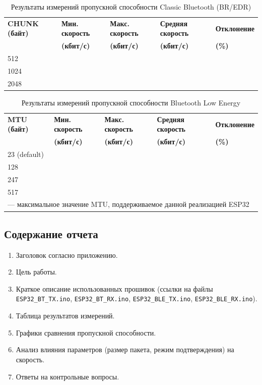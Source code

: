 \begin{table}[htbp]
\centering
\caption{Результаты измерений пропускной способности Classic Bluetooth (BR/EDR)}
\label{tab:bt_results}
\begin{tabularx}{\textwidth}{lXXXX}
\toprule
\textbf{CHUNK (байт)} & \textbf{Мин. скорость} & \textbf{Макс. скорость} & \textbf{Средняя скорость} & \textbf{Отклонение} \\
& \textbf{(кбит/с)} & \textbf{(кбит/с)} & \textbf{(кбит/с)} & \textbf{(\%)} \\
\midrule
512 & & & & \\
1024 & & & & \\
2048 & & & & \\
\bottomrule
\end{tabularx}
\end{table}

\begin{table}[htbp]
\centering
\caption{Результаты измерений пропускной способности Bluetooth Low Energy}
\label{tab:ble_results}
\begin{tabularx}{\textwidth}{lXXXX}
\toprule
\textbf{MTU (байт)} & \textbf{Мин. скорость} & \textbf{Макс. скорость} & \textbf{Средняя скорость} & \textbf{Отклонение} \\
& \textbf{(кбит/с)} & \textbf{(кбит/с)} & \textbf{(кбит/с)} & \textbf{(\%)} \\
\midrule
23 (default) & & & & \\
128 & & & & \\
247 & & & & \\
517 & & & & \\
\bottomrule
\multicolumn{5}{l}{\small * --- максимальное значение MTU, поддерживаемое данной реализацией ESP32} \\
\end{tabularx}
\end{table}

\subsection{Содержание отчета}
\begin{enumerate}[nosep, leftmargin=*]
    \item Заголовок согласно приложению.
    \item Цель работы.
    \item Краткое описание использованных прошивок (ссылки на файлы \texttt{ESP32\_BT\_TX.ino}, \texttt{ESP32\_BT\_RX.ino}, \texttt{ESP32\_BLE\_TX.ino}, \texttt{ESP32\_BLE\_RX.ino}).
    \item Таблица результатов измерений.
    \item Графики сравнения пропускной способности.
    \item Анализ влияния параметров (размер пакета, режим подтверждения) на скорость.
    \item Ответы на контрольные вопросы.
\end{enumerate}

